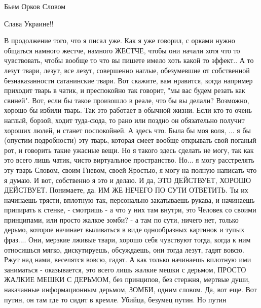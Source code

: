  
 
 
 
 

Бьем Орков Словом

Слава Украине!! 💛 💙 💛 💙 💛 💙 💛 💙

В продолжение того, что я писал уже. Как я уже говорил, с орками нужно общаться
намного жестче, намного ЖЕСТЧЕ, чтобы они начали хотя что то чувствовать, чтобы
вообще то что вы пишете имело хоть какой то эффект.. А то лезут твари, лезут,
все лезут, совершенно наглые, обезумевшие от собственной безнаказанности
сатанинские твари. Вот скажите, вам нравится, когда например приходит тварь в
чатик, и преспокойно так говорит, "мы вас будем резать как свиней". Вот, если
бы такое произошло в реале, что бы вы делали? Возможно, хорошо бы избили тварь.
Так это работает в обычной жизни. Если кто то очень наглый, борзой, ходит
туда-сюда, то рано или поздно он обязательно получит хороших люлей, и станет
поспокойней. А здесь что. Была бы моя воля, ... я бы (опустим подробности) эту
тварь, которая смеет вообще открывать свой поганый рот, и говорить такие
ужасные вещи. Но я такого здесь сделать не могу, так как это всего лишь чатик,
чисто виртуальное пространство. Но... я могу расстрелять эту тварь Словом,
своим Гневом, своей Яростью, я могу на полную написать что я думаю. И вот,
собственно я это и делаю. И да, ЭТО ДЕЙСТВУЕТ, ХОРОШО ДЕЙСТВУЕТ. Понимаете, да.
ИМ ЖЕ НЕЧЕГО ПО СУТИ ОТВЕТИТЬ. Ты их начинаешь трясти, вплотную так,
персонально закатываешь рукава, и начинаешь припирать к стенке, - смотришь - а
что у них там внутри, это Человек со своими принципами, или просто жалкое
зомби? - а там по сути, ничего нет, только дерьмо, которое начинает выливаться
в виде однообразных картинок и тупых фраз.... Они, мерзкие лживые твари, хорошо
себя чувствуют тогда, когда к ним относишься мягко, дискутируешь, обсуждаешь,
они тогда лезут, гадят вовсю. Ржут над нами, веселятся вовсю, гадят. А как
только начинаешь вплотную ими заниматься - оказывается, это всего лишь жалкие
мешки с дерьмом, ПРОСТО ЖАЛКИЕ МЕШКИ С ДЕРЬМОМ, без принципов, без стержня,
мертвые души, накачанные информационным дерьмом, ЗОМБИ, одним словом. Да, вот
еще. Вот путин, он там где то сидит в кремле. Убийца, безумец путин. Но путин
